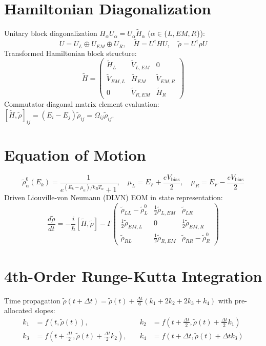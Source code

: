 \documentclass[12pt,a4paper]{article}
\begin{document}
\section{Hamiltonian Diagonalization}
Unitary block diagonalization $H_\alpha U_\alpha = U_\alpha \tilde{H}_\alpha$ ($\alpha \in \{L, EM, R\}$):
\begin{equation}
    U = U_L \oplus U_{EM} \oplus U_R, \quad \tilde{H} = U^\dagger H U, \quad \tilde{\rho} = U^\dagger \rho U
\end{equation}
Transformed Hamiltonian block structure:
\begin{equation}
    \tilde{H} = \begin{pmatrix}
        \tilde{H}_L & \tilde{V}_{L,EM} & 0 \\
        \tilde{V}_{EM,L} & \tilde{H}_{EM} & \tilde{V}_{EM,R} \\
        0 & \tilde{V}_{R,EM} & \tilde{H}_R
    \end{pmatrix}
\end{equation}
Commutator diagonal matrix element evaluation: $[\tilde{H}, \tilde{\rho}]_{ij} = (E_i - E_j)\tilde{\rho}_{ij} = \Omega_{ij} \tilde{\rho}_{ij}$.

\section{Equation of Motion}
\begin{equation}
    \tilde{\rho}^0_{\alpha}(E_k) = \frac{1}{e^{(E_k - \mu_{\alpha})/k_B T_{\alpha}} + 1}, \quad \mu_{L} = E_F + \frac{eV_{\text{bias}}}{2}, \quad \mu_{R} = E_F - \frac{eV_{\text{bias}}}{2}
\end{equation}
Driven Liouville-von Neumann (DLVN) EOM in state representation:
\begin{equation}
    \frac{d\tilde{\rho}}{dt} = -\frac{i}{\hbar}[\tilde{H}, \tilde{\rho}] - \Gamma \begin{pmatrix}
        \tilde{\rho}_{LL} - \tilde{\rho}^0_L & \frac{1}{2}\tilde{\rho}_{L,EM} & \tilde{\rho}_{LR} \\
        \frac{1}{2}\tilde{\rho}_{EM,L} & 0 & \frac{1}{2}\tilde{\rho}_{EM,R} \\
        \tilde{\rho}_{RL} & \frac{1}{2}\tilde{\rho}_{R,EM} & \tilde{\rho}_{RR} - \tilde{\rho}^0_R
    \end{pmatrix}
\end{equation}

\section{4th-Order Runge-Kutta Integration}
Time propagation $\tilde{\rho}(t + \Delta t) = \tilde{\rho}(t) + \frac{\Delta t}{6}(k_1 + 2k_2 + 2k_3 + k_4)$ with pre-allocated slopes:
\begin{align}
    k_1 &= f(t, \tilde{\rho}(t)), \quad & k_2 &= f\left(t + \frac{\Delta t}{2}, \tilde{\rho}(t) + \frac{\Delta t}{2} k_1\right) \\
    k_3 &= f\left(t + \frac{\Delta t}{2}, \tilde{\rho}(t) + \frac{\Delta t}{2} k_2\right), \quad & k_4 &= f(t + \Delta t, \tilde{\rho}(t) + \Delta t k_3)
\end{align}
\end{document}

